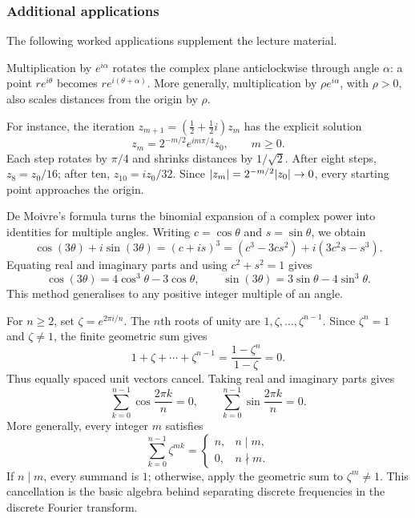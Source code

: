 \documentclass[11pt,a4paper]{amsart}
\begin{document}
\subsubsection{Additional applications}

The following worked applications supplement the lecture material.

\begin{example}
  Multiplication by \(e^{i\alpha}\) rotates the complex plane
  anticlockwise through angle \(\alpha\): a point \(re^{i\theta}\)
  becomes \(re^{i(\theta+\alpha)}\). More generally, multiplication
  by \(\rho e^{i\alpha}\), with \(\rho>0\), also scales distances
  from the origin by \(\rho\).

  For instance, the iteration \(z_{m+1}=(\frac12+\frac12i)z_m\)
  has the explicit solution
  \[
    z_m=2^{-m/2}e^{im\pi/4}z_0,\qquad m\geq0.
  \]
  Each step rotates by \(\pi/4\) and shrinks distances by
  \(1/\sqrt2\). After eight steps, \(z_8=z_0/16\); after ten,
  \(z_{10}=iz_0/32\). Since \(\lvert z_m\rvert=2^{-m/2}\lvert z_0\rvert\to0\),
  every starting point approaches the origin.
\end{example}

\begin{example}
  De Moivre's formula turns the binomial expansion of a complex power
  into identities for multiple angles. Writing \(c=\cos\theta\)
  and \(s=\sin\theta\), we obtain
  \[
    \cos(3\theta)+i\sin(3\theta)
    =(c+is)^3=(c^3-3cs^2)+i(3c^2s-s^3).
  \]
  Equating real and imaginary parts and using \(c^2+s^2=1\) gives
  \[
    \cos(3\theta)=4\cos^3\theta-3\cos\theta,
    \qquad
    \sin(3\theta)=3\sin\theta-4\sin^3\theta.
  \]
  This method generalises to any positive integer multiple of an angle.
\end{example}

\begin{example}
  For \(n\geq2\), set \(\zeta=e^{2\pi i/n}\). The \(n\)th roots
  of unity are \(1,\zeta,\ldots,\zeta^{n-1}\). Since
  \(\zeta^n=1\) and \(\zeta\neq1\), the finite geometric sum gives
  \[
    1+\zeta+\cdots+\zeta^{n-1}
    =\frac{1-\zeta^n}{1-\zeta}=0.
  \]
  Thus equally spaced unit vectors cancel. Taking real and imaginary
  parts gives
  \[
    \sum_{k=0}^{n-1}\cos\frac{2\pi k}{n}=0,
    \qquad \sum_{k=0}^{n-1}\sin\frac{2\pi k}{n}=0.
  \]
  More generally, every integer \(m\) satisfies
  \[
    \sum_{k=0}^{n-1}\zeta^{mk}
    =
    \begin{cases}
      n,& n\mid m,\\
      0,& n\nmid m.
    \end{cases}
  \]
  If \(n\mid m\), every summand is \(1\); otherwise, apply the
  geometric sum to \(\zeta^m\neq1\). This cancellation is the basic
  algebra behind separating discrete frequencies in the discrete
  Fourier transform.
\end{example}
\end{document}
